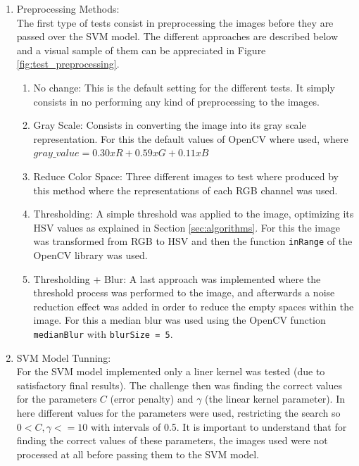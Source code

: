 \documentclass[a4paper,10pt,english]{article}
\begin{document}
        \begin{enumerate}
            \item Preprocessing Methods:\\
            The first type of tests consist in preprocessing the images before they are passed over the SVM model. The different approaches are described below and a visual sample of them can be appreciated in Figure \ref{fig:test_preprocessing}.
            \begin{enumerate}
                \item No change: This is the default setting for the different tests. It simply consists in no performing any kind of preprocessing to the images.
                \item Gray Scale: Consists in converting the image into its gray scale representation. For this the default values of OpenCV where used, where $gray\_value = 0.30xR + 0.59xG + 0.11xB$
                \item Reduce Color Space: Three different images to test where produced by this method where the representations of each RGB channel was used.
                \item Thresholding: A simple threshold was applied to the image, optimizing its HSV values as explained in Section \ref{sec:algorithms}. For this the image was transformed from RGB to HSV and then the function \texttt{inRange} of the OpenCV library was used.
                \item Thresholding + Blur: A last approach was implemented where the threshold process was performed to the image, and afterwards a noise reduction effect was added in order to reduce the empty spaces within the image. For this a median blur was used using the OpenCV function \texttt{medianBlur} with \texttt{blurSize = 5}.
            \end{enumerate}

            \item SVM Model Tunning:\\
                For the SVM model implemented only a liner kernel was tested (due to satisfactory final results). The challenge then was finding the correct values for the parameters $C$ (error penalty) and $\gamma$ (the linear kernel parameter). In here different values for the parameters were used, restricting the search so $ 0 < C, \gamma <= 10 $ with intervals of 0.5. It is important to understand that for finding the correct values of these parameters, the images used were not processed at all before passing them to the SVM model.
        \end{enumerate}
        
\end{document}
